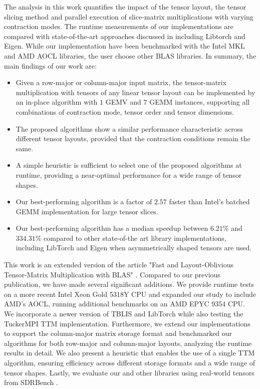 The analysis in this work quantifies the impact of the tensor layout, the tensor slicing method and parallel execution of slice-matrix multiplications with varying contraction modes.
The runtime measurements of our implementations are compared with state-of-the-art approaches discussed in \citep{springer:2018:design, matthews:2018:high, paszke:2019:pytorch} including Libtorch and Eigen. 
While our implementation have been benchmarked with the Intel MKL and AMD AOCL libraries, the user choose other BLAS libraries.
In summary, the main findings of our work are:
\begin{itemize}
	\item %
	Given a row-major or column-major input matrix, the tensor-matrix multiplication with tensors of any linear tensor layout can be implemented by an in-place algorithm with $1$ GEMV and $7$ GEMM instances, supporting all combinations of contraction mode, tensor order and tensor dimensions.
	\item %
	The proposed algorithms show a similar performance characteristic across different tensor layouts, provided that the contraction conditions remain the same.
	\item %
	A simple heuristic is sufficient to select one of the proposed algorithms at runtime, providing a near-optimal performance for a wide range of tensor shapes.	
	\item %
	Our best-performing algorithm is a factor of $2.57$ faster than Intel's batched GEMM implementation for large tensor slices.
	\item %
	Our best-performing algorithm has a median speedup between $6.21$\% and $334.31$\% compared to other state-of-the art library implementations, including LibTorch and Eigen when asymmetrically shaped tensors are used.
\end{itemize}


This work is an extended version of the article "Fast and Layout-Oblivious Tensor-Matrix Multiplication with BLAS" \cite{bassoy:2024:ttm}. 
Compared to our previous publication, we have made several significant additions. 
We provide runtime tests on a more recent Intel Xeon Gold 5318Y CPU and expanded our study to include AMD's AOCL, running additional benchmarks on an AMD EPYC 9354 CPU. 
We incorporate a newer version of TBLIS and LibTorch while also testing the TuckerMPI TTM implementation. 
Furthermore, we extend our implementations to support the column-major matrix storage format and benchmarked our algorithms for both row-major and column-major layouts, analyzing the runtime results in detail. 
We also present a heuristic that enables the use of a single TTM algorithm, ensuring efficiency across different storage formats and a wide range of tensor shapes.
Lastly, we evaluate our and other libraries using real-world tensors from SDRBench \cite{zhao:2020:sdrbench}.

